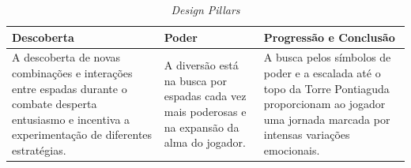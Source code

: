 \newcommand{\whydiscovery}{
    A descoberta de novas combinações e interações entre 
    espadas durante o combate desperta entusiasmo e 
    incentiva a experimentação de diferentes estratégias.
}

\newcommand{\whypower}{
    A diversão está na busca por espadas cada vez mais 
    poderosas e na expansão da alma do jogador.
}

\newcommand{\whyadvancement}{
    A busca pelos símbolos de poder e a escalada até o 
    topo da Torre Pontiaguda proporcionam ao jogador uma 
    jornada marcada por intensas variações emocionais.
}


\begin{table}[ht]
    \centering
    
    \caption{\textit{Design Pillars}}
    \label{table_design_pillars}

    \begin{tabularx}{\textwidth}{XXX}
        \toprule[0.25pt] %
        Descoberta      & Poder     & Progressão e Conclusão    \\
        \midrule[1.5pt]
        \whydiscovery   & \whypower & \whyadvancement           \\
        \bottomrule[0.25pt]
    \end{tabularx}
\end{table}
